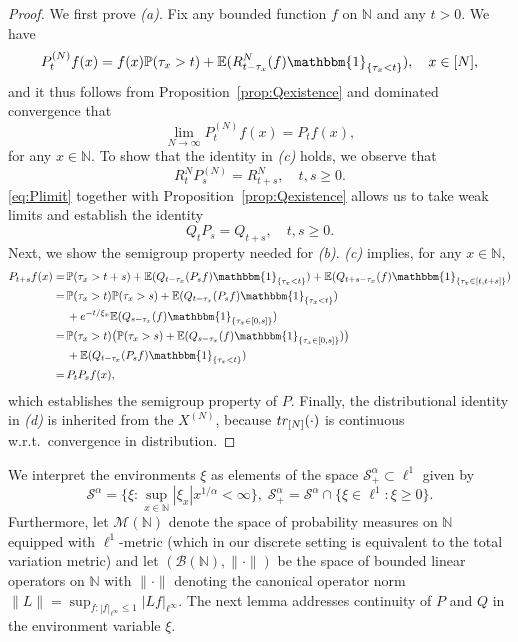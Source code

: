 \documentclass[11pt,a4paper]{scrartcl}
\numberwithin{equation}{section}
\theoremstyle{plain}
\theoremstyle{definition}
\theoremstyle{remark}
\newcommand{\bE}{\ensuremath{\mathbb{E}}}
\newcommand{\bN}{\ensuremath{\mathbb{N}}}
\newcommand{\bP}{\ensuremath{\mathbb{P}}}
\newcommand{\ind}{\ensuremath{\mathbbm{1}}}
\begin{document}
\begin{proof}
We first prove \textit{(a)}. Fix any bounded function $f$ on $\bN$ and any $t>0$. We have $$P_t^{(N)}f(x)=f(x)\bP(\tau_x>t)+ \bE(R^{N}_{t-\tau_x}(f)\ind_{\{\tau_x<t\}}),\quad x\in[N],$$
and it thus follows from Proposition~\ref{prop:Qexistence} and dominated convergence that \begin{equation}\label{eq:Plimit}\lim_{N\to\infty}P_t^{(N)}f(x)=P_tf(x),
\end{equation}
for any $x\in\bN.$  To show that the identity in \textit{(c)} holds, we observe that 
$$
R^N_tP^{(N)}_s=R^{N}_{t+s}, \quad t,s\geq 0.
$$
\eqref{eq:Plimit} together with Proposition~\ref{prop:Qexistence} allows us to take weak limits and establish the identity
\begin{equation}\label{eq:entrance}Q_tP_s=Q_{t+s}, \quad t,s\geq 0.
\end{equation}
Next, we show the semigroup property needed for \textit{(b)}. \textit{(c)} implies, for any $x\in\bN$,
\begin{align*}
 P_{t+s}f(x) =\, & \bP(\tau_x>t+s)+ \bE(Q_{t-\tau_x} (P_sf)\ind_{\{\tau_x<t\}})+\bE(Q_{t+s-\tau_x}(f)\ind_{\{\tau_x\in[t,t+s]\}})\\
   =\, & \bP(\tau_x>t)\bP(\tau_x>s)  +\bE(Q_{t-\tau_x}(P_sf)\ind_{\{\tau_x<t\}})\\
&  + \textup{e}^{-t/\xi_x}\bE(Q_{s-\tau_x}(f)\ind_{\{\tau_x\in[0,s]\}})\\
 =\,  & \bP(\tau_x>t)\big(\bP(\tau_x>s)  +\bE(Q_{s-\tau_x}(f)\ind_{\{\tau_x\in[0,s]\}})\big)\\
& + \bE(Q_{t-\tau_x} (P_sf)\ind_{\{\tau_x<t\}})\\
 =\, & P_tP_sf(x), 
\end{align*}
which establishes the semigroup property of $P$. Finally, the distributional identity in \textit{(d)} is inherited from the $X^{(N)}$, because $\textup{tr}_{[N]}(\cdot)$ is continuous w.r.t.\ convergence in distribution.
\end{proof}
We interpret the environments $\xi$ as elements of the space $\mathcal{S}^{\alpha}_+\subset \ell^1$ given by
\[
\mathcal{S}^{\alpha}=\{\xi: \sup_{x\in\bN} |\xi_x| x^{1/\alpha}<\infty\},\; \mathcal{S}^{\alpha}_+=\mathcal{S}^\alpha \cap \{\xi\in\ell^1:\xi\geq 0 \}.
\]
Furthermore, let $\mathcal{M}(\bN)$ denote the space of probability measures on $\bN$ equipped with $\ell^1$-metric (which in our discrete setting is equivalent to the total variation metric) and let $ (\mathcal{B}(\bN), \|\cdot\|)$ be the space of bounded linear operators on $\bN$ with $\|\cdot\|$ denoting the canonical operator norm $\|L\|= \sup_{f:|f|_{\ell^\infty}\leq 1}|Lf|_{\ell^\infty}$. The next lemma addresses continuity of $P$ and $Q$ in the environment variable $\xi$.
\end{document}
